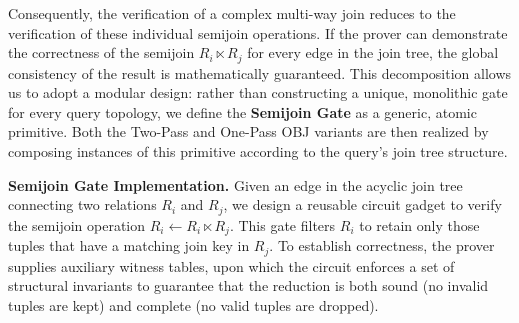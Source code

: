 \documentclass[sigconf]{acmart}
\begin{document}
Consequently, the verification of a complex multi-way join reduces to the verification of these individual semijoin operations. If the prover can demonstrate the correctness of the semijoin $R_i \ltimes R_j$ for every edge in the join tree, the global consistency of the result is mathematically guaranteed. This decomposition allows us to adopt a modular design: rather than constructing a unique, monolithic gate for every query topology, we define the \textbf{Semijoin Gate} as a generic, atomic primitive. Both the Two-Pass and One-Pass OBJ variants are then realized by composing instances of this primitive according to the query's join tree structure.

\noindent\textbf{Semijoin Gate Implementation.}
Given an edge in the acyclic join tree connecting two relations $R_i$ and $R_j$, we design a reusable circuit gadget to verify the semijoin operation $R_i \leftarrow R_i \ltimes R_j$. This gate filters $R_i$ to retain only those tuples that have a matching join key in $R_j$. To establish correctness, the prover supplies auxiliary witness tables, upon which the circuit enforces a set of structural invariants to guarantee that the reduction is both sound (no invalid tuples are kept) and complete (no valid tuples are dropped).
\end{document}
